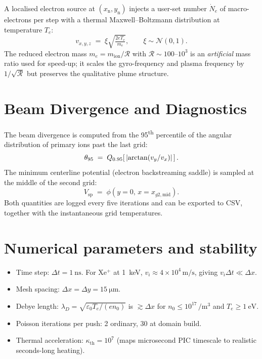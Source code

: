 \documentclass[11pt,a4paper]{article}
\begin{document}
A localised electron source at
\((x_{\mathrm{n}},y_{\mathrm{n}})\) injects a user-set number
\(\dot N_{e}\) of macro-electrons per step with a thermal
Maxwell--Boltzmann distribution at temperature \(T_{e}\):
\begin{equation}
    v_{x,y,z} \;=\; \xi \sqrt{\tfrac{2 e T_{e}}{m_{e}}},
    \qquad \xi\sim\mathcal N(0,1).
\end{equation}
The reduced electron mass
\(m_{e}=m_{\mathrm{ion}}/\mathcal{R}\) with
\(\mathcal{R}\sim100\)--\(10^{3}\) is an \emph{artificial}
mass ratio used for speed-up; it scales the gyro-frequency
and plasma frequency by \(1/\sqrt{\mathcal R}\) but preserves
the qualitative plume structure.

\section{Beam Divergence and Diagnostics}

The beam divergence is computed from the 95\textsuperscript{th}
percentile of the angular distribution of primary ions past the
last grid:
\begin{equation}
    \theta_{95} \;=\;
    Q_{0.95}\!\left[\,\abs{\arctan\!\left(v_{y}/v_{x}\right)}\,\right].
\end{equation}
The minimum centerline potential (electron backstreaming
saddle) is sampled at the middle of the second grid:
\begin{equation}
    V_{\mathrm{sp}} \;=\; \phi\!\left(y=0,\,x=x_{g2,\mathrm{mid}}\right).
\end{equation}
Both quantities are logged every five iterations and can be
exported to CSV, together with the instantaneous grid
temperatures.

\section{Numerical parameters and stability}

\begin{itemize}[nosep]
    \item Time step: \(\Delta t = \SI{1}{\nano\second}\).  For
        Xe\(^{+}\) at \SI{1}{\kilo\electronvolt},
        \(v_{i}\approx 4\times10^{4}\,\si{\meter\per\second}\),
        giving \(v_{i}\Delta t\ll\Delta x\).
    \item Mesh spacing: \(\Delta x=\Delta y=\SI{15}{\micro\meter}\).
    \item Debye length: \(\lambda_{D}=\sqrt{\varepsilon_{0}T_{e}/(e n_{0})}\)
        is \(\gtrsim\Delta x\) for
        \(n_{0}\leq 10^{17}\,\si{\per\meter\cubed}\) and
        \(T_{e}\geq\SI{1}{\electronvolt}\).
    \item Poisson iterations per push: 2 ordinary,
        30 at domain build.
    \item Thermal acceleration: \(\kappa_{\mathrm{th}}=10^{7}\)
        (maps microsecond PIC timescale to realistic seconds-long
        heating).
\end{itemize}
\end{document}
